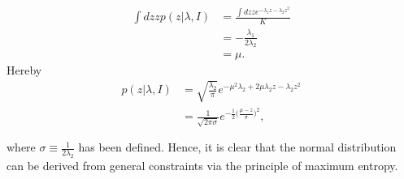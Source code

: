 \begin{example}
	\begin{equation}
		\begin{split}
			\int dz zp(z|\lambda,I) &= \frac{\int dz ze^{-\lambda_1z-\lambda_2z^2}}{K}\\
			&= -\frac{\lambda_1}{2\lambda_2}\\
			&=\mu.
		\end{split}
	\end{equation}
	Hereby
	\begin{equation}
		\begin{split}
			p(z|\lambda,I) &= \sqrt{\frac{\lambda_2}{\pi}}e^{-\mu^2\lambda_2+2\mu \lambda_2z-\lambda_2z^2}\\
			&= \frac{1}{\sqrt{2\pi\sigma}}e^{-\frac{1}{2}\big(\frac{\mu-z}{\sigma}\big)^2},\\\\
		\end{split}
	\end{equation}
	where $\sigma\equiv \frac{1}{2\lambda_2}$ has been defined. Hence, it is clear that the normal distribution can be derived from general constraints via the principle of maximum entropy.
\end{example}

